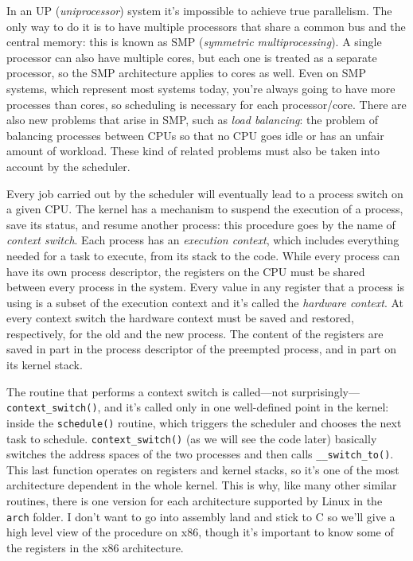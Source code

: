 \documentclass[10pt]{book}
\begin{document}
In an UP (\textit{uniprocessor}) system it's impossible to achieve true parallelism. The only way to do it is to have multiple processors that share a common bus and the central memory: this is known as SMP (\textit{symmetric multiprocessing}). A single processor can also have multiple cores, but each one is treated as a separate processor, so the SMP architecture applies to cores as well. Even on SMP systems, which represent most systems today, you're always going to have more processes than cores, so scheduling is necessary for each processor/core. There are also new problems that arise in SMP, such as \textit{load balancing}: the problem of balancing processes between CPUs so that no CPU goes idle or has an unfair amount of workload. These kind of related problems must also be taken into account by the scheduler.

Every job carried out by the scheduler will eventually lead to a process switch on a given CPU. The kernel has a mechanism to suspend the execution of a process, save its status, and resume another process: this procedure goes by the name of \textit{context switch}. Each process has an \textit{execution context}, which includes everything needed for a task to execute, from its stack to the code. While every process can have its own process descriptor, the registers on the CPU must be shared between every process in the system. Every value in any register that a process is using is a subset of the execution context and it's called the \textit{hardware context}. At every context switch the hardware context must be saved and restored, respectively, for the old and the new process. The content of the registers are saved in part in the process descriptor of the preempted process, and in part on its kernel stack.

The routine that performs a context switch is called---not surprisingly---\verb|context_switch()|, and it's called only in one well-defined point in the kernel: inside the \verb|schedule()| routine, which triggers the scheduler and chooses the next task to schedule. \verb|context_switch()| (as we will see the code later) basically switches the address spaces of the two processes and then calls \verb|__switch_to()|. This last function operates on registers and kernel stacks, so it's one of the most architecture dependent in the whole kernel. This is why, like many other similar routines, there is one version for each architecture supported by Linux in the \verb|arch| folder. I don't want to go into assembly land and stick to C so we'll give a high level view of the procedure on x86, though it's important to know some of the registers in the x86 architecture. %
\end{document}
